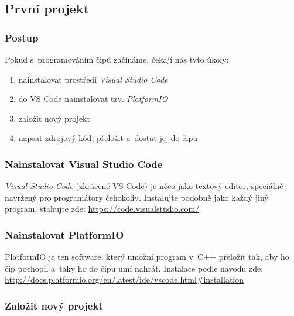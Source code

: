 \subsection{První projekt}
 
 
\subsubsection*{Postup}

Pokud s~programováním čipů začínáme, čekají nás tyto úkoly:
\begin{enumerate}
\item  nainstalovat prostředí {\it Visual Studio Code}
\item  do VS Code nainstalovat tzv. {\it PlatformIO }
\item  založit nový projekt
\item  napsat zdrojový kód, přeložit a~dostat jej do čipu 
\end{enumerate}


\label{vsc} \subsubsection{Nainstalovat  Visual Studio Code}

{\it Visual Studio Code}  (zkráceně VS Code) je něco jako textový editor, speciálně navržený pro programátory čehokoliv.
Instalujte podobně jako každý jiný program, stahujte zde: \url{https://code.visualstudio.com/}  

\label{platformio} \subsubsection{Nainstalovat PlatformIO}

 PlatformIO je ten software, který umožní program v~C++ přeložit tak, aby ho čip pochopil a~taky ho do čipu umí nahrát. 
Instalace podle návodu zde: \url{http://docs.platformio.org/en/latest/ide/vscode.html\#installation}

\subsubsection{Založit nový projekt}

